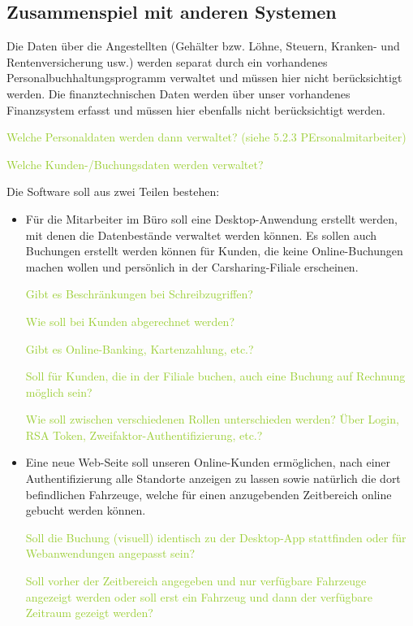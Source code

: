 \subsection{Zusammenspiel mit anderen Systemen}

Die Daten über die Angestellten (Gehälter bzw. Löhne, Steuern, Kranken- und Rentenversicherung usw.) werden separat durch ein vorhandenes Personalbuchhaltungsprogramm verwaltet und müssen hier nicht berücksichtigt werden. Die finanztechnischen Daten werden über unser vorhandenes Finanzsystem erfasst und müssen hier ebenfalls nicht berücksichtigt werden. 

\textcolor{YellowGreen}{Welche Personaldaten werden dann verwaltet? (siehe 5.2.3 PErsonalmitarbeiter)}

\textcolor{YellowGreen}{Welche Kunden-/Buchungsdaten werden verwaltet?}

Die Software soll aus zwei Teilen bestehen:  

\begin{itemize}
    \item Für die Mitarbeiter im Büro soll eine Desktop-Anwendung erstellt werden, mit denen die Datenbestände verwaltet werden können. Es sollen auch Buchungen erstellt werden können für Kunden, die keine Online-Buchungen machen wollen und persönlich in der Carsharing-Filiale erscheinen. 
    
    \textcolor{YellowGreen}{Gibt es Beschränkungen bei Schreibzugriffen?}

    \textcolor{YellowGreen}{Wie soll bei Kunden abgerechnet werden?}

    \textcolor{YellowGreen}{Gibt es Online-Banking, Kartenzahlung, etc.?}

    \textcolor{YellowGreen}{Soll für Kunden, die in der Filiale buchen, auch eine Buchung auf Rechnung möglich sein?}

    \textcolor{YellowGreen}{Wie soll zwischen verschiedenen Rollen unterschieden werden? Über Login, RSA Token, Zweifaktor-Authentifizierung, etc.?}

    \item Eine neue Web-Seite soll unseren Online-Kunden ermöglichen, nach einer Authentifizierung alle Standorte anzeigen zu lassen sowie natürlich die dort befindlichen Fahrzeuge, welche für einen anzugebenden Zeitbereich online gebucht werden können. 
    
    \textcolor{YellowGreen}{Soll die Buchung (visuell) identisch zu der Desktop-App stattfinden oder für Webanwendungen angepasst sein?}

    \textcolor{YellowGreen}{Soll vorher der Zeitbereich angegeben und nur verfügbare Fahrzeuge angezeigt werden oder soll erst ein Fahrzeug und dann der verfügbare Zeitraum gezeigt werden?}
\end{itemize}

